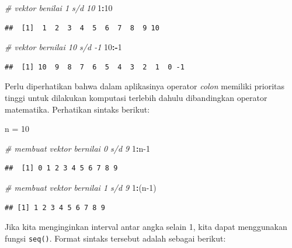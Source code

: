 \documentclass[]{book}
\newenvironment{Shaded}{\begin{snugshade}}{\end{snugshade}}
\newcommand{\CommentTok}[1]{\textcolor[rgb]{0.56,0.35,0.01}{\textit{#1}}}
\newcommand{\DecValTok}[1]{\textcolor[rgb]{0.00,0.00,0.81}{#1}}
\newcommand{\NormalTok}[1]{#1}
\newcommand{\OperatorTok}[1]{\textcolor[rgb]{0.81,0.36,0.00}{\textbf{#1}}}
\newcommand{\StringTok}[1]{\textcolor[rgb]{0.31,0.60,0.02}{#1}}
\theoremstyle{definition}
\theoremstyle{definition}
\theoremstyle{definition}
\theoremstyle{remark}
\begin{document}
\begin{Shaded}
\begin{Highlighting}[]
\CommentTok{# vektor benilai 1 s/d 10}
\DecValTok{1}\OperatorTok{:}\DecValTok{10}
\end{Highlighting}
\end{Shaded}

\begin{verbatim}
##  [1]  1  2  3  4  5  6  7  8  9 10
\end{verbatim}

\begin{Shaded}
\begin{Highlighting}[]
\CommentTok{# vektor bernilai 10 s/d -1}
\DecValTok{10}\OperatorTok{:-}\DecValTok{1}
\end{Highlighting}
\end{Shaded}

\begin{verbatim}
##  [1] 10  9  8  7  6  5  4  3  2  1  0 -1
\end{verbatim}

Perlu diperhatikan bahwa dalam aplikasinya operator \emph{colon} memiliki prioritas tinggi untuk dilakukan komputasi terlebih dahulu dibandingkan operator matematika. Perhatikan sintaks berikut:

\begin{Shaded}
\begin{Highlighting}[]
\NormalTok{n =}\StringTok{ }\DecValTok{10}

\CommentTok{# membuat vektor bernilai 0 s/d 9}
\DecValTok{1}\OperatorTok{:}\NormalTok{n}\DecValTok{-1}
\end{Highlighting}
\end{Shaded}

\begin{verbatim}
##  [1] 0 1 2 3 4 5 6 7 8 9
\end{verbatim}

\begin{Shaded}
\begin{Highlighting}[]
\CommentTok{# membuat vektor bernilai 1 s/d 9}
\DecValTok{1}\OperatorTok{:}\NormalTok{(n}\DecValTok{-1}\NormalTok{)}
\end{Highlighting}
\end{Shaded}

\begin{verbatim}
## [1] 1 2 3 4 5 6 7 8 9
\end{verbatim}

Jika kita menginginkan interval antar angka selain 1, kita dapat menggunakan fungsi \texttt{seq()}. Format sintaks tersebut adalah sebagai berikut:
\end{document}
